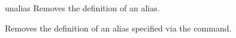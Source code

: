 \begin{nusmvCommand} {unalias} {Removes the definition of an alias.}
 

Removes the definition of an alias specified via the  command.

\begin{cmdOpt}
\end{cmdOpt}

\end{nusmvCommand}
